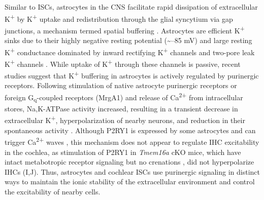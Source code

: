 \documentclass[9pt,lineno]{elife}
\begin{document}
Similar to ISCs, astrocytes in the CNS facilitate rapid dissipation of extracellular K\textsuperscript{+} by K\textsuperscript{+} uptake and redistribution through the glial syncytium via gap junctions, a mechanism termed spatial buffering \citep{Kofuji2004}. Astrocytes are efficient K\textsuperscript{+} sinks due to their highly negative resting potential (\textasciitilde --85 mV) and large resting K\textsuperscript{+} conductance dominated by inward rectifying K\textsuperscript{+} channels and two-pore leak K\textsuperscript{+} channels \citep{Ryoo2016,Olsen2012}. While uptake of K\textsuperscript{+} through these channels is passive, recent studies suggest that K\textsuperscript{+} buffering in astrocytes is actively regulated by purinergic receptors. Following stimulation of native astrocyte purinergic receptors or foreign G\textsubscript{q}-coupled receptors (MrgA1) and release of Ca\textsuperscript{2+} from intracellular stores, Na,K-ATPase activity increased, resulting in a transient decrease in extracellular K\textsuperscript{+}, hyperpolarization of nearby neurons, and reduction in their spontaneous activity \citep{Wang2012}. Although P2RY1 is expressed by some astrocytes and can trigger Ca\textsuperscript{2+} waves \citep{Gallagher2003}, this mechanism does not appear to regulate IHC excitability in the cochlea, as stimulation of P2RY1 in \textit{Tmem16a} cKO mice, which have intact metabotropic receptor signaling but no crenations \citep{Wang2015}, did not hyperpolarize IHCs (I,J). Thus, astrocytes and cochlear ISCs use purinergic signaling in distinct ways to maintain the ionic stability of the extracellular environment and control the excitability of nearby cells.
\end{document}
